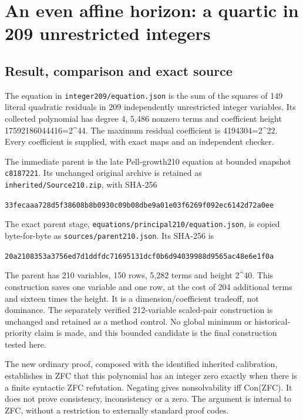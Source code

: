\section{An even affine horizon: a quartic in 209 unrestricted
integers}\label{an-even-affine-horizon-a-quartic-in-209-unrestricted-integers}

\subsection{Result, comparison and exact
source}\label{result-comparison-and-exact-source}

The equation in \nolinkurl{integer209/equation.json} is the sum of the
squares of 149 literal quadratic residuals in 209 independently
unrestricted integer variables. Its collected polynomial has degree 4,
5,486 nonzero terms and coefficient height 17592186044416=2\^{}44. The
maximum residual coefficient is 4194304=2\^{}22. Every coefficient is
supplied, with exact maps and an independent checker.

The immediate parent is the late Pell-growth210 equation at bounded
snapshot \texttt{c8187221}. Its unchanged original archive is retained as
\texttt{inherited/Source210.zip}, with SHA-256
\begin{center}\scriptsize
\texttt{33fecaaa728d5f38608b8b0930c09b08dbe9a01e03f6269f092ec6142d72a0ee}
\end{center}
The exact parent stage, \texttt{equations/principal210/equation.json}, is
copied byte-for-byte as \texttt{sources/parent210.json}. Its SHA-256 is
\begin{center}\scriptsize
\texttt{20a2108353a3756ed7d1ddfdc71695131dcf0b6d94039988d9565ac48e6e1f0a}
\end{center}

The parent has 210 variables, 150 rows, 5,282 terms and height 2\^{}40.
This construction saves one variable and one row, at the cost of 204
additional terms and sixteen times the height. It is a
dimension/coefficient tradeoff, not dominance. The separately verified
212-variable scaled-pair construction is unchanged and retained as a
method control. No global minimum or historical-priority claim is made,
and this bounded candidate is the final construction tested here.

The new ordinary proof, composed with the identified inherited
calibration, establishes in ZFC that this polynomial has an integer zero
exactly when there is a finite syntactic ZFC refutation. Negating gives
nonsolvability iff Con(ZFC). It does not prove consistency,
inconsistency or a zero. The argument is internal to ZFC, without a
restriction to externally standard proof codes.

